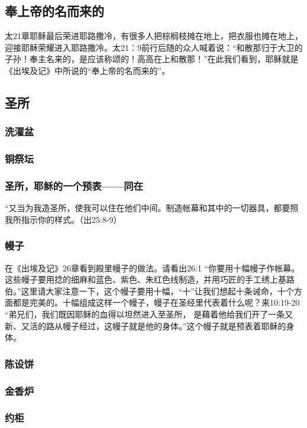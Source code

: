\subsection{奉上帝的名而来的}
太21章耶稣最后荣进耶路撒冷，有很多人把棕榈枝摊在地上，把衣服也摊在地上，迎接耶稣荣耀进入耶路撒冷。太21：9前行后随的众人喊着说：“和散那归于大卫的子孙！奉主名来的，是应该称颂的！高高在上和散那！”在此我们看到，耶稣就是《出埃及记》中所说的“奉上帝的名而来的”。

\subsection{圣所}
\subsubsection{洗濯盆}
\subsubsection{铜祭坛}
\subsubsection{圣所，耶稣的一个预表——同在}
“又当为我造圣所，使我可以住在他们中间。制造帐幕和其中的一切器具，都要照我所指示你的样式。（出25:8-9）

\subsubsection{幔子}
在《出埃及记》26章看到殿里幔子的做法。请看出26:1 “你要用十幅幔子作帐幕。这些幔子要用捻的细麻和蓝色、紫色、朱红色线制造，并用巧匠的手工绣上基路伯。”这里请大家注意一下，这个幔子要用十幅，“十”让我们想起十条诫命，十个方面都是完美的。十幅组成这样一个幔子，幔子在圣经里代表着什么呢？来10:19-20  “弟兄们，我们既因耶稣的血得以坦然进入至圣所， 是藉着他给我们开了一条又新、又活的路从幔子经过，这幔子就是他的身体。”这个幔子就是预表着耶稣的身体。

\subsubsection{陈设饼}



\subsubsection{金香炉}
\subsubsection{约柜}


